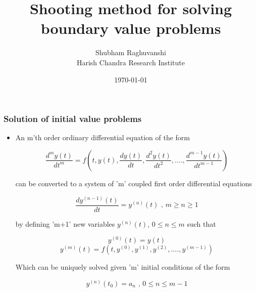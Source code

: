\documentclass{beamer}
\title{Shooting method for solving boundary value problems} %
\author{Shubham Raghuvanshi \\Harish Chandra Research Institute } %
\date{\today} %
\begin{document}
\begin{frame}
\titlepage %
\end{frame}
\begin{frame}
	\frametitle{Solution of initial value problems}

	\begin{itemize}
		
		\item An m'th order ordinary differential equation of the form 
		
		\begin{equation}
		\frac{d^m y(t)}{d t^m} = f \left(t, y(t), \frac{d y(t)}{d t}, \frac{d^2 y(t)}{d t^2},...., \frac{d^{m-1} y(t)}{d t^{m-1}}      \right)
		\end{equation}
			
		can be converted to a system of 'm' coupled first order differential equations 

		\begin{equation}
		\frac{d y^{(n-1)}(t)}{dt} = y^{(n)}(t)  \text{     ,    } m \ge n \ge 1 		
		\end{equation}

by defining 'm+1' new variables $y^{(n)}(t)$,   $ 0 \le n \le m $ such that  
		
	\begin{equation}
	y^{(0)}(t) = y(t)
	\end{equation}
	\begin{equation}
	y^{(m)}(t) = f(t, y^{(0)}, y^{(1)}, y^{(2)},...., y^{(m-1)}   )
	\end{equation}
	
Which can be uniquely solved given 'm' initial conditions of the form 

\begin{equation}
     y^{(n)}(t_0) = a_n  \text{     ,    }  0 \le n \le m-1
\end{equation}

	\end{itemize}	
\end{frame}
\end{document}

